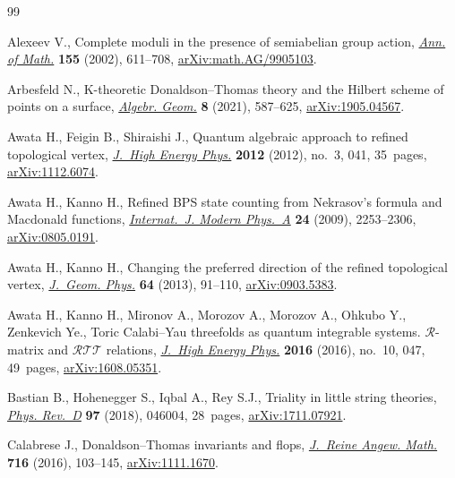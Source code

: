 \begin{thebibliography}{99}
\footnotesize\itemsep=0pt

Alexeev V., Complete moduli in the presence of semiabelian group action,
 \href{https://doi.org/10.2307/3062130}{\textit{Ann. of Math.}} \textbf{155} (2002), 611--708,
 \href{https://arxiv.org/abs/math.AG/9905103}{arXiv:math.AG/9905103}.

Arbesfeld N., K-theoretic {D}onaldson--{T}homas theory and the {H}ilbert scheme
 of points on a surface, \href{https://doi.org/10.14231/ag-2021-018}{\textit{Algebr. Geom.}} \textbf{8} (2021), 587--625,
 \href{https://arxiv.org/abs/1905.04567}{arXiv:1905.04567}.

Awata H., Feigin B., Shiraishi J., Quantum algebraic approach to refined
 topological vertex, \href{https://doi.org/10.1007/JHEP03(2012)041}{\textit{J.~High Energy Phys.}} \textbf{2012} (2012),
 no.~3, 041, 35~pages, \href{https://arxiv.org/abs/1112.6074}{arXiv:1112.6074}.

Awata H., Kanno H., Refined {BPS} state counting from {N}ekrasov's formula and
 {M}acdonald functions, \href{https://doi.org/10.1142/S0217751X09043006}{\textit{Internat.~J. Modern Phys.~A}} \textbf{24}
 (2009), 2253--2306, \href{https://arxiv.org/abs/0805.0191}{arXiv:0805.0191}.

Awata H., Kanno H., Changing the preferred direction of the refined topological
 vertex, \href{https://doi.org/10.1016/j.geomphys.2012.10.014}{\textit{J.~Geom. Phys.}} \textbf{64} (2013), 91--110,
 \href{https://arxiv.org/abs/0903.5383}{arXiv:0903.5383}.

Awata H., Kanno H., Mironov A., Morozov A., Morozov A., Ohkubo Y., Zenkevich
 {\relax Ye}., Toric {C}alabi--{Y}au threefolds as quantum integrable systems.
 {$\mathcal R$}-matrix and {$\mathcal{RTT}$} relations, \href{https://doi.org/10.1007/JHEP10(2016)047}{\textit{J.~High Energy
 Phys.}} \textbf{2016} (2016), no.~10, 047, 49~pages, \href{https://arxiv.org/abs/1608.05351}{arXiv:1608.05351}.

Bastian B., Hohenegger S., Iqbal A., Rey S.J., Triality in little string
 theories, \href{https://doi.org/10.1103/physrevd.97.046004}{\textit{Phys. Rev.~D}} \textbf{97} (2018), 046004, 28~pages,
 \href{https://arxiv.org/abs/1711.07921}{arXiv:1711.07921}.

Calabrese J., Donaldson--{T}homas invariants and flops, \href{https://doi.org/10.1515/crelle-2014-0017}{\textit{J.~Reine Angew.
 Math.}} \textbf{716} (2016), 103--145, \href{https://arxiv.org/abs/1111.1670}{arXiv:1111.1670}.


\end{thebibliography}
